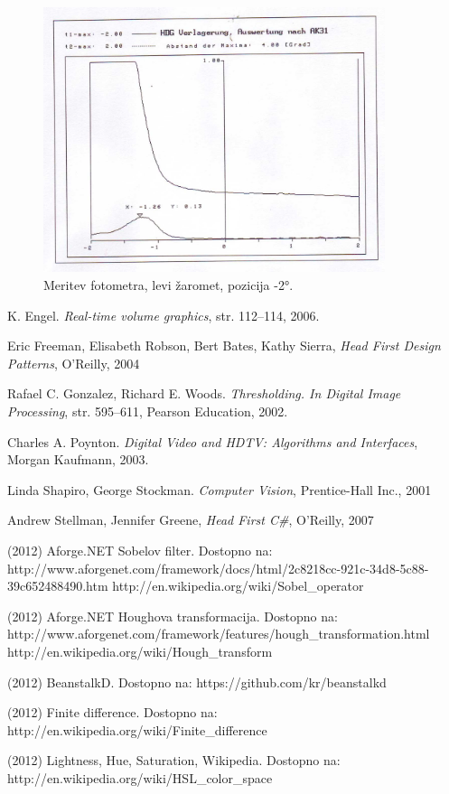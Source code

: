 \documentclass[oneside, a4paper, 12pt]{book}
\begin{document}
\begin{figure}
\begin{center}
\includegraphics[width=10cm]{slike/fotometer-levi--2.jpg}
\end{center}
\caption{Meritev fotometra, levi žaromet, pozicija -2°.}
\label{pic:foto-6}
\end{figure}



\begin{thebibliography}{99}

 K. Engel. \textit{Real-time volume graphics}, str. 112–114, 2006.

 Eric Freeman, Elisabeth Robson, Bert Bates, Kathy Sierra, \textit{Head First Design Patterns}, O'Reilly, 2004

 Rafael C. Gonzalez, Richard E. Woods. \textit{Thresholding. In Digital Image Processing}, str. 595–611, Pearson Education, 2002.

 Charles A. Poynton. \textit{Digital Video and HDTV: Algorithms and Interfaces}, Morgan Kaufmann, 2003.

 Linda Shapiro, George Stockman. \textit{Computer Vision}, Prentice-Hall Inc., 2001

 Andrew Stellman, Jennifer Greene, \textit{Head First C\#}, O'Reilly, 2007

 (2012) Aforge.NET Sobelov filter. Dostopno na:\\ 
http://www.aforgenet.com/framework/docs/html/2c8218cc-921c-34d8-5c88-39c652488490.htm 
http://en.wikipedia.org/wiki/Sobel\_operator

 (2012) Aforge.NET Houghova transformacija. Dostopno na: 
http://www.aforgenet.com/framework/features/hough\_transformation.html 
http://en.wikipedia.org/wiki/Hough\_transform 

 (2012) BeanstalkD. Dostopno na:  
https://github.com/kr/beanstalkd 

 (2012) Finite difference. Dostopno na:\\ 
http://en.wikipedia.org/wiki/Finite\_difference

 (2012) Lightness, Hue, Saturation, Wikipedia. Dostopno na: \\
http://en.wikipedia.org/wiki/HSL\_color\_space

\end{thebibliography}
\end{document}
